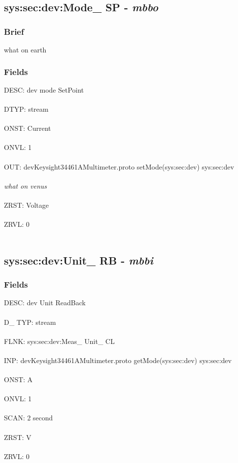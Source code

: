 \documentclass[12pt]{article}
\begin{document}
\subsection{sys:sec:dev:Mode\_ SP - \textit{mbbo}}
\subsubsection{Brief}
what on earth
\subsubsection{Fields}
DESC: dev mode SetPoint\\\\ DTYP: stream\\\\ ONST: Current\\\\ ONVL: 1\\\\ OUT: devKeysight34461AMultimeter.proto setMode(sys:sec:dev) sys:sec:dev\\\\ \textit{what on venus}\\\\ 
ZRST: Voltage\\\\ ZRVL: 0\\\\ \newpage
\subsection{sys:sec:dev:Unit\_ RB - \textit{mbbi}}
\subsubsection{Fields}
DESC: dev Unit ReadBack\\\\ D\_ TYP: stream\\\\ FLNK: sys:sec:dev:Meas\_ Unit\_ CL\\\\ INP: devKeysight34461AMultimeter.proto getMode(sys:sec:dev) sys:sec:dev\\\\ ONST: A\\\\ ONVL: 1\\\\ SCAN: 2 second\\\\ ZRST: V\\\\ ZRVL: 0\\\\ \newpage
\end{document}
